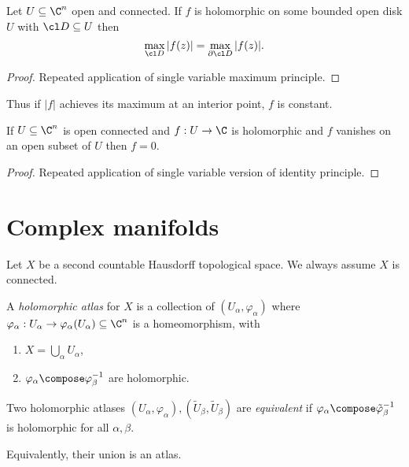 \documentclass[a4paper]{article}
\begin{document}
\begin{proposition}
  Let \(U \subseteq \C^n\) open and connected. If \(f\) is holomorphic on some bounded open disk \(U\) with \(\cl D \subseteq U\) then
  \[
    \max_{\cl D} |f(z)| = \max_{\partial \cl D} |f(z)|.
  \]
\end{proposition}

\begin{proof}
  Repeated application of single variable maximum principle.
\end{proof}

Thus if \(|f|\) achieves its maximum at an interior point, \(f\) is constant.

\begin{proposition}
  If \(U \subseteq \C^n\) is open connected and \(f: U \to \C\) is holomorphic and \(f\) vanishes on an open subset of \(U\) then \(f = 0\).
\end{proposition}

\begin{proof}
  Repeated application of single variable version of identity principle.
\end{proof}

\section{Complex manifolds}

Let \(X\) be a second countable Hausdorff topological space. We always assume \(X\) is connected.

\begin{definition}
  A \emph{holomorphic atlas} for \(X\) is a collection of \((U_\alpha, \varphi_\alpha)\) where \(\varphi_\alpha: U_\alpha \to \varphi_\alpha(U_\alpha) \subseteq \C^n\) is a homeomorphism, with
  \begin{enumerate}
  \item \(X = \bigcup_\alpha U_\alpha\),
  \item \(\varphi_\alpha \compose \varphi_\beta^{-1}\) are holomorphic.
  \end{enumerate}
\end{definition}

\begin{definition}
  Two holomorphic atlases \((U_\alpha, \varphi_\alpha), (\tilde U_\beta, \tilde U_\beta)\) are \emph{equivalent} if \(\varphi_\alpha \compose \tilde \varphi_\beta^{-1}\) is holomorphic for all \(\alpha, \beta\).

  Equivalently, their union is an atlas.
\end{definition}
\end{document}
